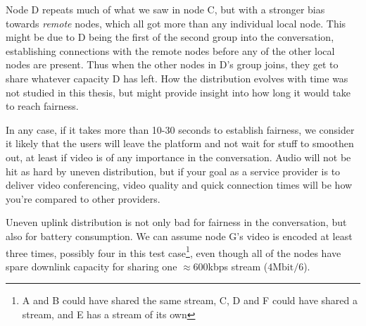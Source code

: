 Node D repeats much of what we saw in node C, but with a stronger bias towards \emph{remote} nodes, which all got more than any individual local node. This might be due to D being the first of the second group into the conversation, establishing connections with the remote nodes before any of the other local nodes are present. Thus when the other nodes in D's group joins, they get to share whatever capacity D has left. How the distribution evolves with time was not studied in this thesis, but might provide insight into how long it would take to reach fairness.

In any case, if it takes more than 10-30 seconds to establish fairness, we consider it likely that the users will leave the platform and not wait for stuff to smoothen out, at least if video is of any importance in the conversation. Audio will not be hit as hard by uneven distribution, but if your goal as a service provider is to deliver video conferencing, video quality and quick connection times will be how you're compared to other providers.

Uneven uplink distribution is not only bad for fairness in the conversation, but also for battery consumption. We can assume node G's video is encoded at least three times, possibly four in this test case\footnote{A and B could have shared the same stream, C, D and F could have shared a stream, and E has a stream of its own}, even though all of the nodes have spare downlink capacity for sharing one $\approx$600kbps stream ($4\text{Mbit}/6$).
